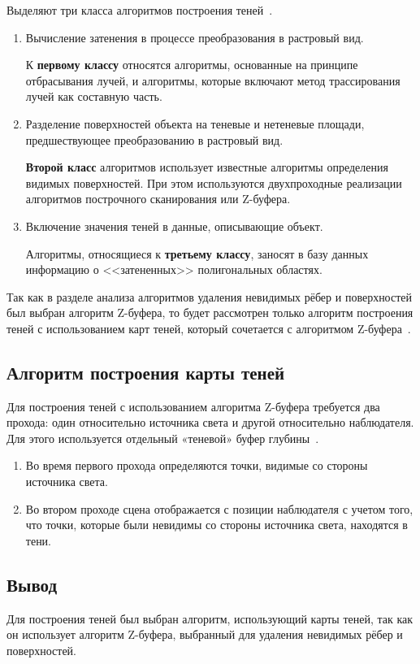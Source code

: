 Выделяют три класса алгоритмов построения теней~\cite{shadow}.
\begin{enumerate}
	\item Вычисление затенения в процессе преобразования в растровый вид.
	
	К \textbf{первому классу} относятся алгоритмы, основанные на принципе
	отбрасывания лучей, и алгоритмы, которые включают метод трассирования
	лучей как составную часть.
	\item Разделение поверхностей объекта на теневые и нетеневые площади, предшествующее преобразованию в растровый вид.
	
	\textbf{Второй класс} алгоритмов использует известные алгоритмы определения
	видимых поверхностей. При этом используются двухпроходные реализации
	алгоритмов построчного сканирования или Z-буфера.
	\item Включение значения теней в данные, описывающие объект.
	
	Алгоритмы, относящиеся к \textbf{третьему классу}, заносят в базу данных
	информацию о <<затененных>> полигональных областях.
\end{enumerate}

Так как в разделе анализа алгоритмов удаления невидимых рёбер и поверхностей был выбран алгоритм Z-буфера, то будет рассмотрен только алгоритм построения теней с использованием карт теней, который сочетается с алгоритмом Z-буфера~\cite{shadow, shadow2}.

\subsection{Алгоритм построения карты теней}

Для построения теней с использованием алгоритма Z-буфера требуется два прохода: один относительно источника света и другой относительно наблюдателя. Для этого используется отдельный «теневой» буфер глубины~\cite{shadow}.
\begin{enumerate}
	\item Во время первого прохода определяются точки, видимые со стороны источника света.
	\item Во втором проходе сцена отображается с позиции наблюдателя с учетом того, что точки, которые были невидимы со стороны источника света, находятся в тени.
\end{enumerate}

\subsection*{Вывод}
Для построения теней был выбран алгоритм, использующий карты теней, так как он использует алгоритм Z-буфера, выбранный для удаления невидимых рёбер и поверхностей. 

